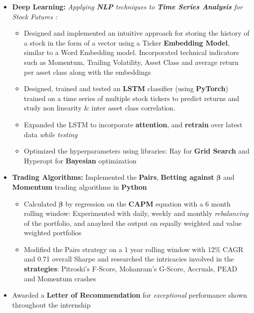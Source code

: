 \documentclass{article}
\begin{document}
\begin{itemize}[itemsep = -1 mm, leftmargin=*]
    \item \textbf{Deep Learning: }{\it Applying \textbf{NLP} techniques to \textbf{Time Series Analysis} for Stock Futures :}
    \vspace{-6pt}
    \begin{itemize}[itemsep = -0.6 mm, leftmargin=*]
      \item Designed and implemented an intuitive approach for storing the history of a stock in the form of a vector using a Ticker\vspace{-0.3mm} \textbf{Embedding Model}, similar to a Word Embedding model. Incorporated technical indicators such as Momentum,\vspace{-0.3mm} Trailing Volatility, Asset Class and average return per asset class along with the embeddings
     \item Designed, trained and tested an \textbf{LSTM} classifier (using \textbf{PyTorch}) trained on a time series of multiple stock tickers to\vspace{-0.3mm} predict returns and study non linearity \& inter asset class correlation. 
     \item Expanded the LSTM to incorporate \textbf{attention}, and \textbf{retrain} over latest data \textit{while testing}
     \item Optimized the hyperparameters using libraries: Ray for \textbf{Grid Search} and Hyperopt for \textbf{Bayesian} optimization
    \end{itemize}
    \vspace{-3.5pt}
    \item \textbf{Trading Algorithms:} Implemented the \textbf{Pairs}, \textbf{Betting against} $\bm{\beta}$ and \textbf{Momentum} trading algorithms in \textbf{Python}
    \vspace{-7pt}
    \begin{itemize}[itemsep = -0.6 mm, leftmargin=*]
      \item Calculated $\bm{\beta}$ by regression on the \textbf{CAPM} equation with a 6 month rolling window: Experimented with daily, weekly\vspace{-0.3mm} and monthly \textit{rebalancing} of the portfolio, and anaylzed the output on equally weighted and value weighted portfolios
     \item Modified the Pairs strategy on a 1 year rolling window with 12\% CAGR and 0.71 overall Sharpe and researched the\vspace{-0.3mm} intricacies involved in the \textbf{strategies}:  Pitroski's F-Score, Mohanram's G-Score, Accruals, PEAD and Momentum crashes
    \end{itemize}
    \vspace{-3.5pt}
    \item Awarded a \textbf{Letter of Recommendation} for {\it exceptional} performance shown throughout the internship
\end{itemize}
\end{document}
